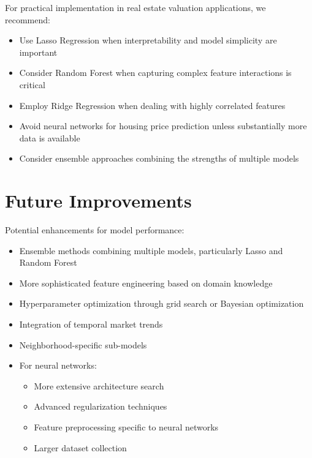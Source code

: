 For practical implementation in real estate valuation applications, we recommend:
\begin{itemize}
    \item Use Lasso Regression when interpretability and model simplicity are important
    \item Consider Random Forest when capturing complex feature interactions is critical
    \item Employ Ridge Regression when dealing with highly correlated features
    \item Avoid neural networks for housing price prediction unless substantially more data is available
    \item Consider ensemble approaches combining the strengths of multiple models
\end{itemize}

\section{Future Improvements}
Potential enhancements for model performance:
\begin{itemize}
    \item Ensemble methods combining multiple models, particularly Lasso and Random Forest
    \item More sophisticated feature engineering based on domain knowledge
    \item Hyperparameter optimization through grid search or Bayesian optimization
    \item Integration of temporal market trends
    \item Neighborhood-specific sub-models
    \item For neural networks: 
    \begin{itemize}
        \item More extensive architecture search
        \item Advanced regularization techniques
        \item Feature preprocessing specific to neural networks
        \item Larger dataset collection
    \end{itemize}
\end{itemize} 